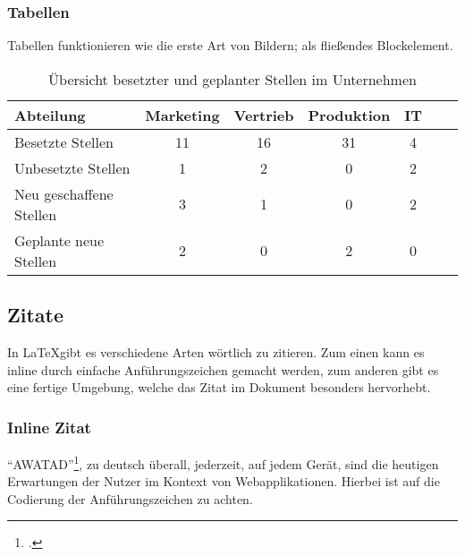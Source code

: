 \subsubsection{Tabellen}
  Tabellen funktionieren wie die erste Art von Bildern; als fließendes Blockelement.

  \begin{table}[tb]
    \centering
    \begin{tabular}{@{}lcccccc@{}}
    \toprule
    Abteilung               & Marketing & Vertrieb & Produktion & IT \\ \midrule
    Besetzte Stellen        & 11        & 16       & 31         & 4  \\
    Unbesetzte Stellen      & 1         & 2        & 0          & 2  \\
    Neu geschaffene Stellen & 3         & 1        & 0          & 2  \\
    Geplante neue Stellen   & 2         & 0        & 2          & 0  \\ \bottomrule
    \end{tabular}
    \caption{Übersicht besetzter und geplanter Stellen im Unternehmen}
    \label{tbl_proglang}
  \end{table}

\subsection{Zitate}
  In \LaTeX gibt es verschiedene Arten wörtlich zu zitieren.
  Zum einen kann es inline durch einfache Anführungszeichen gemacht werden, 
  zum anderen gibt es eine fertige Umgebung, welche das Zitat im Dokument besonders hervorhebt.
  
  \subsubsection{Inline Zitat}
    "`\gls{AWATAD}"'\footcite[S. 2703]{timmerer2019journey}, zu deutsch überall, jederzeit, auf jedem Gerät,
    sind die heutigen Erwartungen der Nutzer im Kontext von Webapplikationen.
    Hierbei ist auf die Codierung der Anführungszeichen zu achten.
  
